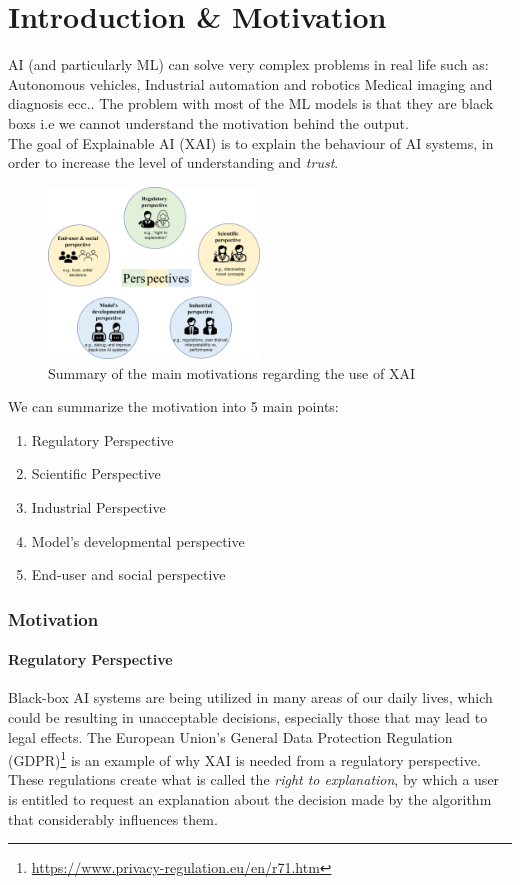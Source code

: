 \part{Introduction \& Motivation}
AI (and particularly ML) can solve very complex problems in real life such as: Autonomous vehicles, Industrial automation and robotics Medical imaging and diagnosis ecc..
The problem with most of the ML models is that they are black boxs i.e we cannot understand the motivation behind the output.\\

The goal of Explainable AI (XAI) is to explain the behaviour of AI systems, in order to increase the
level of understanding and \emph{trust}. 
\begin{figure}[H]
    \includegraphics[width=0.5\textwidth]{img/motivation.jpg}
    \centering
    \caption{Summary of the main motivations regarding the use of XAI}
\end{figure}
We can summarize the motivation into 5 main points:
\begin{enumerate}
    \item Regulatory Perspective
    \item Scientific Perspective
    \item Industrial Perspective
    \item Model's developmental perspective
    \item End-user and social perspective
\end{enumerate}
\section{Motivation}
\subsection*{Regulatory Perspective}
Black-box AI systems are being utilized in many areas of our daily lives, which could be resulting in unacceptable decisions, especially those that may lead to legal effects. 
The European Union's General Data Protection Regulation (GDPR)\footnote{\url{https://www.privacy-regulation.eu/en/r71.htm}} is an example of why XAI is needed from a regulatory perspective. 
These regulations create what is called the \emph{right to explanation}, by which a user is entitled to request an explanation about the decision made by the algorithm that considerably influences them.

